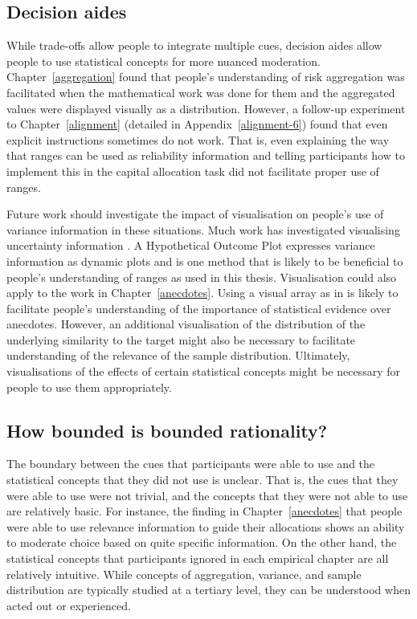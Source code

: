 \documentclass[a4paper, nobind, dvipsnames]{templates/ociamthesis}
\theoremstyle{definition}
\theoremstyle{definition}
\theoremstyle{definition}
\theoremstyle{definition}
\theoremstyle{remark}
\begin{document}
\subsection{Decision aides}

While trade-offs allow people to integrate multiple cues, decision aides allow
people to use statistical concepts for more nuanced moderation.
Chapter~\ref{aggregation} found that people's understanding of risk aggregation
was facilitated when the mathematical work was done for them and the aggregated
values were displayed visually as a distribution. However, a follow-up
experiment to Chapter~\ref{alignment} (detailed in Appendix~\ref{alignment-6})
found that even explicit instructions sometimes do not work. That is, even
explaining the way that ranges can be used as reliability information and
telling participants how to implement this in the capital allocation task did
not facilitate proper use of ranges.

Future work should investigate the impact of visualisation on people's use of
variance information in these situations. Much work has investigated visualising
uncertainty information \autocite{bostrom2008,maceachren1992,kinkeldey2017,padilla2018,davis1997,ristovski2014,brodlie2012,johnson2003,potter2012,lipkus1999,lipkus2007,spiegelhalter2011,pang1997,kox2018,lapinski2009,torsneyweir2015}. A Hypothetical Outcome Plot \autocites[HOP;][]{kale2019,hullman2015} expresses variance information as dynamic plots and is one method
that is likely to be beneficial to people's understanding of ranges as used in
this thesis. Visualisation could also apply to the work in
Chapter~\ref{anecdotes}. Using a visual array as in \textcite{jaramillo2019} is likely to
facilitate people's understanding of the importance of statistical evidence over
anecdotes. However, an additional visualisation of the distribution of the
underlying similarity to the target might also be necessary to facilitate
understanding of the relevance of the sample distribution. Ultimately,
visualisations of the effects of certain statistical concepts might be necessary
for people to use them appropriately.

\subsection{How bounded is bounded rationality?}

The boundary between the cues that participants were able to use and the
statistical concepts that they did not use is unclear. That is, the cues that
they were able to use were not trivial, and the concepts that they were not able
to use are relatively basic. For instance, the finding in
Chapter~\ref{anecdotes} that people were able to use relevance information to
guide their allocations shows an ability to moderate choice based on quite
specific information. On the other hand, the statistical concepts that
participants ignored in each empirical chapter are all relatively intuitive.
While concepts of aggregation, variance, and sample distribution are typically
studied at a tertiary level, they can be understood when acted out or
experienced.
\end{document}
